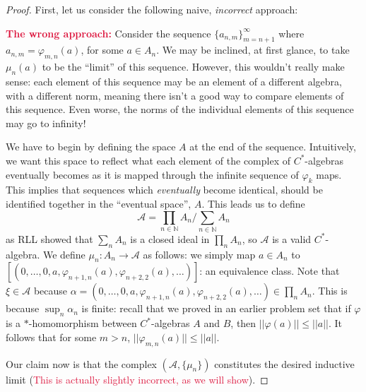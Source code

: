 \documentclass[aps,pra,showpacs,notitlepage,onecolumn,superscriptaddress,nofootinbib]{revtex4-1}
\newcommand{\pop}[1]{\textcolor{crimson}{#1}}
\theoremstyle{definition}
\begin{document}
\begin{proof}
  \noindent First, let us consider the following naive, \emph{incorrect} approach:
  \newline

  \noindent \textbf{\pop{The wrong approach:}} Consider the sequence $\{a_{n, m}\}_{m = n + 1}^{\infty}$ where $a_{n, m} = \varphi_{m, n}(a)$, for some $a \in A_n$. We may be inclined, at first glance, to
  take $\mu_n(a)$ to be the ``limit'' of this sequence. However, this wouldn't really make sense: each element of this sequence may be an element of a different algebra,
  with a different norm, meaning there isn't a good way to compare elements of this sequence. Even worse, the norms of the individual elements of this sequence may go to infinity!
  \newline

  \noindent We have to begin by defining the space $A$ at the end of the sequence. Intuitively, we want this space to reflect what each element of the complex of $C^{*}$-algebras eventually becomes
  as it is mapped through the infinite sequence of $\varphi_k$ maps. This implies that sequences which \emph{eventually} become identical, should be identified together in the ``eventual space'', $A$.
  This leads us to define
  \begin{equation}
    \mathcal{A} = \displaystyle\prod_{n \in \mathbb{N}} A_n \Big/ \displaystyle\sum_{n \in \mathbb{N}} A_n
  \end{equation}
  as RLL showed that $\sum_{n} A_n$ is a closed ideal in $\prod_{n} A_n$, so $\mathcal{A}$ is a valid $C^{*}$-algebra. We define $\mu_n : A_n \rightarrow \mathcal{A}$ as follows: we simply map $a \in A_n$
  to $[(0, \dots, 0, a, \varphi_{n + 1, n}(a), \varphi_{n + 2, 2}(a), \dots)]$: an equivalence class. Note that $\xi \in \mathcal{A}$ because $\alpha = (0, \dots, 0, a, \varphi_{n + 1, n}(a), \varphi_{n + 2, 2}(a), \dots) \in \prod_{n} A_n$.
  This is because $\sup_n \alpha_n$ is finite: recall that we proved in an earlier problem set that if $\varphi$ is a $*$-homomorphism between $C^{*}$-algebras $A$ and $B$, then $||\varphi(a)|| \leq ||a||$. It follows that for some $m > n$,
  $||\varphi_{m, n}(a)|| \leq ||a||$.
  \newline

  \noindent Our claim now is that the
  complex $(\mathcal{A}, \{\mu_n\})$ constitutes the desired inductive limit (\pop{This is actually slightly incorrect, as we will show}).
  \newline


\end{proof}
\end{document}
